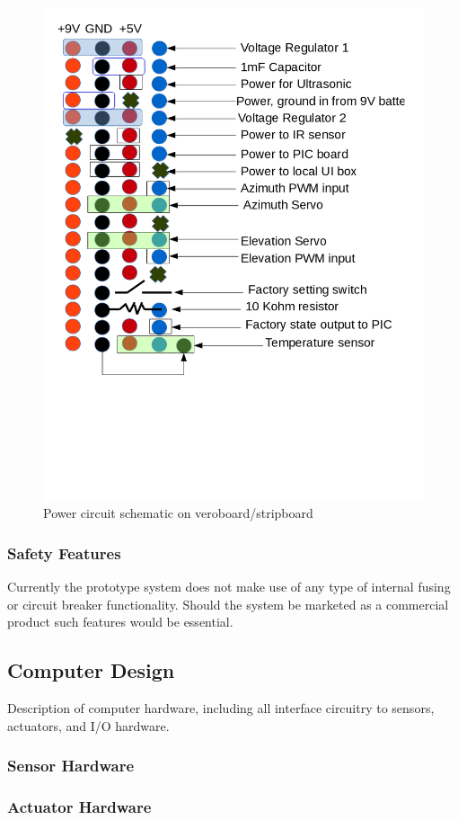 \documentclass[]{report}
\begin{document}
\begin{figure}
\centering
\includegraphics[width=0.7\linewidth]{"../Diagrams/PowerCircuit"}
\caption[State Diagram]{Power circuit schematic on veroboard/stripboard}
\label{fig:PowerBusDiagram}
\end{figure}

\subsubsection{Safety Features}
Currently the prototype system does not make use of any type of internal fusing or circuit breaker functionality. Should the system be marketed as a commercial product such features would be essential.

\subsection{Computer Design}
Description of computer hardware, including all interface circuitry to sensors, actuators, and I/O hardware.

\subsubsection{Sensor Hardware}

\subsubsection{Actuator Hardware}
\end{document}
